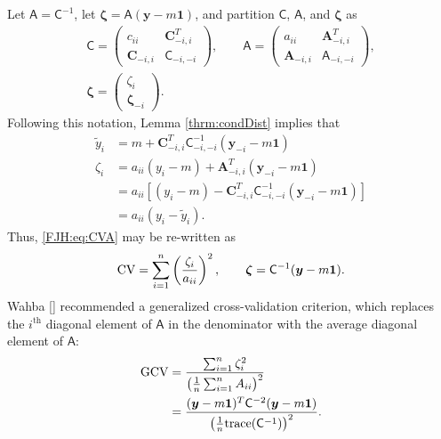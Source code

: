 \documentclass[twocolumn]{svjour3}          %
\newcommand{\bm}[1]{\boldsymbol{#1}}
\newcommand{\trace}[1]{\textup{trace}{#1}}
\newcommand{\vzeta}{{\bm{\zeta}}}
\newcommand{\vA}{\bm{A}}
\newcommand{\vC}{\bm{C}}
\newcommand{\vy}{\bm{y}}
\newcommand{\vone}{\bm{1}}
\newcommand{\mA}{\mathsf{A}}
\newcommand{\mC}{\mathsf{C}}
\begin{document}
Let $\mA = \mC^{-1}$, let $\vzeta = \mA (\vy - m \vone)$, and partition $\mC$, $\mA$, and $\vzeta$ as
\begin{gather*}
\mC = \begin{pmatrix} c_{ii}  & \vC_{-i,i}^T \\  \vC_{-i,i} & \mC_{-i,-i}\end{pmatrix}, \qquad
\mA = \begin{pmatrix} a_{ii}  & \vA_{-i,i}^T \\  \vA_{-i,i} & \mA_{-i,-i}\end{pmatrix}, \\ \vzeta = \begin{pmatrix} \zeta_i   \\  \vzeta_{-i} \end{pmatrix}.
\end{gather*}
Following this notation, Lemma \ref{thrm:condDist} implies that 
\begin{align*}
\widetilde{y}_i & = m + \vC^T_{-i,i} \mC_{-i,-i}^{-1} (\vy_{-i} -m \vone)  \\
\zeta_i  & = a_{ii}(y_i - m) + \vA_{-i,i}^T(\vy_{-i} - m \vone) \\
& = a_{ii}[(y_i - m) - \vC^T_{-i,i} \mC_{-i,-i}^{-1} (\vy_{-i} -m \vone)] \\
& = a_{ii}(y_i - \widetilde{y}_i).
\end{align*}
Thus, \eqref{FJH:eq:CVA} may be re-written as 
\begin{equation*} %
\textup{CV} = \sum_{i=1}^n \left(\frac{\zeta_i}{a_{ii}} \right)^2, \qquad \vzeta = \mC^{-1}(\vy - m \vone).
\end{equation*}
Wahba \ref{} recommended a generalized cross-validation criterion, which replaces the $i^{\text{th}}$ diagonal element of $\mA$ in the denominator with the average diagonal element of $\mA$:
\begin{align} 
\nonumber
\textup{GCV} &
= \frac{\sum_{i=1}^n\zeta_i^2}{\left(\frac 1n \sum_{i=1}^n A_{ii} \right)^2} \\
\label{FJH:eq:GCV}
& = \frac{(\vy - m\vone)^T \mC^{-2} (\vy - m \vone)}{\left(\frac 1n \trace(\mC^{-1}) \right)^2}.
\end{align}
\end{document}
